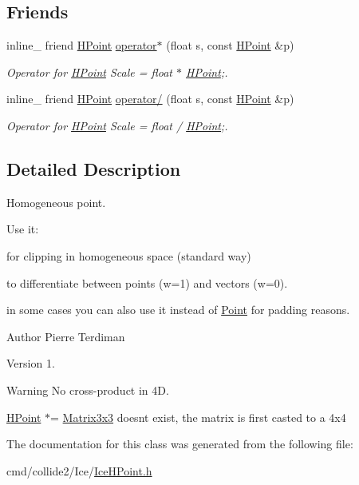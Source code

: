 \subsection*{Friends}
\begin{DoxyCompactItemize}
\item 
inline\+\_\+ friend \hyperlink{classHPoint}{H\+Point} \hyperlink{classHPoint_a1bf5d9b145d44fedc8cf73ffcd3ba4ce}{operator$\ast$} (float s, const \hyperlink{classHPoint}{H\+Point} \&p)\hypertarget{classHPoint_a1bf5d9b145d44fedc8cf73ffcd3ba4ce}{}\label{classHPoint_a1bf5d9b145d44fedc8cf73ffcd3ba4ce}

\begin{DoxyCompactList}\small\item\em Operator for \hyperlink{classHPoint}{H\+Point} Scale = float $\ast$ \hyperlink{classHPoint}{H\+Point};. \end{DoxyCompactList}\item 
inline\+\_\+ friend \hyperlink{classHPoint}{H\+Point} \hyperlink{classHPoint_a55dfa9a54972eb6849952bf355ebca45}{operator/} (float s, const \hyperlink{classHPoint}{H\+Point} \&p)\hypertarget{classHPoint_a55dfa9a54972eb6849952bf355ebca45}{}\label{classHPoint_a55dfa9a54972eb6849952bf355ebca45}

\begin{DoxyCompactList}\small\item\em Operator for \hyperlink{classHPoint}{H\+Point} Scale = float / \hyperlink{classHPoint}{H\+Point};. \end{DoxyCompactList}\end{DoxyCompactItemize}


\subsection{Detailed Description}
Homogeneous point.

Use it\+:
\begin{DoxyItemize}
\item for clipping in homogeneous space (standard way)
\item to differentiate between points (w=1) and vectors (w=0).
\item in some cases you can also use it instead of \hyperlink{classPoint}{Point} for padding reasons.
\end{DoxyItemize}

\begin{DoxyAuthor}{Author}
Pierre Terdiman 
\end{DoxyAuthor}
\begin{DoxyVersion}{Version}
1. 
\end{DoxyVersion}
\begin{DoxyWarning}{Warning}
No cross-\/product in 4D. 

\hyperlink{classHPoint}{H\+Point} $\ast$= \hyperlink{classMatrix3x3}{Matrix3x3} doesn\textquotesingle{}t exist, the matrix is first casted to a 4x4 
\end{DoxyWarning}


The documentation for this class was generated from the following file\+:\begin{DoxyCompactItemize}
\item 
cmd/collide2/\+Ice/\hyperlink{IceHPoint_8h}{Ice\+H\+Point.\+h}\end{DoxyCompactItemize}
